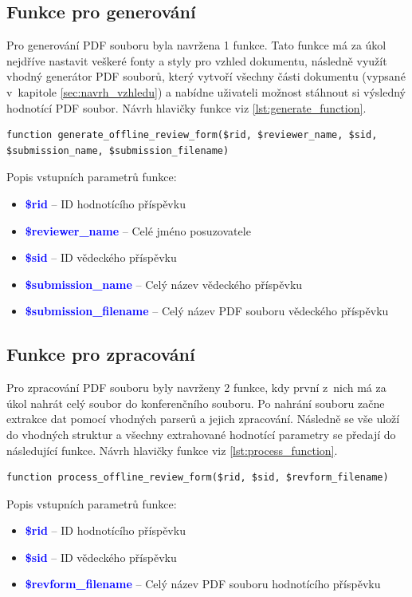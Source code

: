 \subsection{Funkce pro generování}
Pro generování PDF souboru byla navržena 1 funkce. Tato funkce má za úkol nejdříve nastavit veškeré fonty a styly pro vzhled dokumentu, následně využít vhodný generátor PDF souborů, který vytvoří všechny části dokumentu (vypsané v~kapitole \ref{sec:navrh_vzhledu}) a nabídne uživateli možnost stáhnout si výsledný hodnotící PDF soubor. Návrh hlavičky funkce viz \ref{lst:generate_function}.

\lstset{style=phpstyle}
\begin{lstlisting}[caption = {Návrh hlavičky funkce pro generování PDF souboru}, label = {lst:generate_function}, captionpos=b]
function generate_offline_review_form($rid, $reviewer_name, $sid, $submission_name, $submission_filename)
\end{lstlisting}
Popis vstupních parametrů funkce:
\begin{itemize}
	\item\textcolor{blue}{\textbf{\$rid}} -- ID hodnotícího příspěvku
	\item\textcolor{blue}{\textbf{\$reviewer\_name}} -- Celé jméno posuzovatele
	\item\textcolor{blue}{\textbf{\$sid}} -- ID vědeckého příspěvku
	\item\textcolor{blue}{\textbf{\$submission\_name}} -- Celý název vědeckého příspěvku
	\item\textcolor{blue}{\textbf{\$submission\_filename}} -- Celý název PDF souboru vědeckého příspěvku
\end{itemize}

\subsection{Funkce pro zpracování}
Pro zpracování  PDF souboru byly navrženy 2 funkce, kdy první z~nich má za úkol nahrát celý soubor do konferenčního souboru. Po nahrání souboru začne extrakce dat pomocí vhodných parserů a jejich zpracování. Následně se vše uloží do vhodných struktur a všechny extrahované hodnotící parametry se předají do následující funkce. Návrh hlavičky funkce viz \ref{lst:process_function}.

\begin{lstlisting}[caption = {Návrh hlavičky funkce pro extrakci dat}, label = {lst:process_function}, captionpos=b]
function process_offline_review_form($rid, $sid, $revform_filename)
\end{lstlisting}
Popis vstupních parametrů funkce:
\begin{itemize}
	\item\textcolor{blue}{\textbf{\$rid}} -- ID hodnotícího příspěvku
	\item\textcolor{blue}{\textbf{\$sid}} -- ID vědeckého příspěvku
	\item\textcolor{blue}{\textbf{\$revform\_filename}} -- Celý název PDF souboru hodnotícího příspěvku
\end{itemize}

